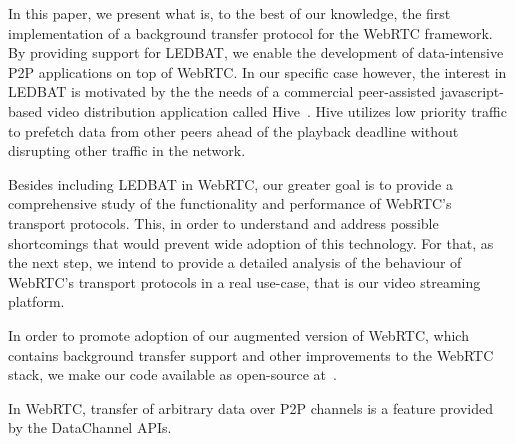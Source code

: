 \documentclass{sig-alternate}
\begin{document}
In this paper, we present what is, to the best of our knowledge, the first implementation
of a background transfer protocol for the WebRTC framework. By providing support for
LEDBAT, we enable the development of data-intensive P2P applications on top of WebRTC. In
our specific case however, the interest in LEDBAT is motivated by the the needs of a
commercial peer-assisted javascript-based video distribution application called
Hive~\cite{hive-js}. Hive utilizes low priority traffic to prefetch data from other peers
ahead of the playback deadline without disrupting other traffic in the network.

Besides including LEDBAT in WebRTC, our greater goal is to provide a comprehensive study
of the functionality and performance of WebRTC's transport protocols. This, in order to
understand and address possible shortcomings that would prevent wide adoption of this
technology. For that, as the next step, we intend to provide a detailed analysis of the
behaviour of WebRTC's transport protocols in a real use-case, that is our video streaming
platform.

In order to promote adoption of our augmented version of WebRTC, which contains background
transfer support and other improvements to the WebRTC stack, we make our code available
as open-source at~\cite{webrtc-utp}.








In WebRTC, transfer of arbitrary data over P2P channels is a feature provided by the
DataChannel APIs.

\end{document}
